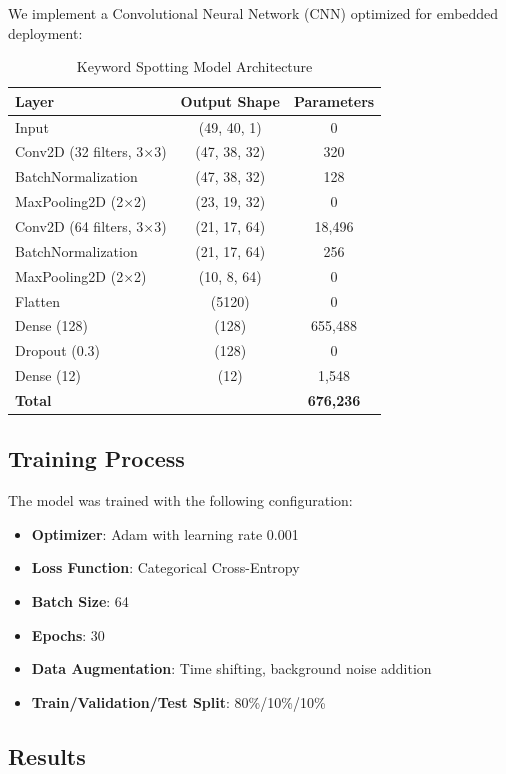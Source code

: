 \documentclass[12pt,a4paper]{article}
\begin{document}
We implement a Convolutional Neural Network (CNN) optimized for embedded deployment:

\begin{table}[H]
\centering
\caption{Keyword Spotting Model Architecture}
\begin{tabular}{lcc}
\toprule
\textbf{Layer} & \textbf{Output Shape} & \textbf{Parameters} \\
\midrule
Input & (49, 40, 1) & 0 \\
Conv2D (32 filters, 3×3) & (47, 38, 32) & 320 \\
BatchNormalization & (47, 38, 32) & 128 \\
MaxPooling2D (2×2) & (23, 19, 32) & 0 \\
Conv2D (64 filters, 3×3) & (21, 17, 64) & 18,496 \\
BatchNormalization & (21, 17, 64) & 256 \\
MaxPooling2D (2×2) & (10, 8, 64) & 0 \\
Flatten & (5120) & 0 \\
Dense (128) & (128) & 655,488 \\
Dropout (0.3) & (128) & 0 \\
Dense (12) & (12) & 1,548 \\
\midrule
\textbf{Total} & & \textbf{676,236} \\
\bottomrule
\end{tabular}
\end{table}

\subsection{Training Process}

The model was trained with the following configuration:

\begin{itemize}
    \item \textbf{Optimizer}: Adam with learning rate 0.001
    \item \textbf{Loss Function}: Categorical Cross-Entropy
    \item \textbf{Batch Size}: 64
    \item \textbf{Epochs}: 30
    \item \textbf{Data Augmentation}: Time shifting, background noise addition
    \item \textbf{Train/Validation/Test Split}: 80\%/10\%/10\%
\end{itemize}

\subsection{Results}
\end{document}
